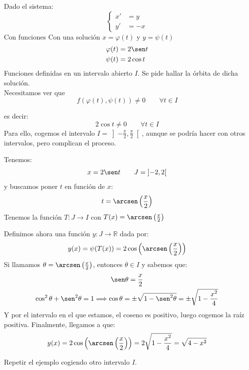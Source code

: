 \begin{ejemplo}
    Dado el sistema:
    \begin{equation*}
        \left\{\begin{array}{rl}
                x' &= y \\
                y' &= -x
        \end{array}\right.
    \end{equation*}
    Con funciones
    Con una solución $x = \varphi(t)$ y $y=\psi(t)$
    \begin{align*}
        \varphi(t) &= 2\sen t \\
        \psi(t) &= 2\cos t \\
    \end{align*}
    Funciones definidas en un intervalo abierto $I$. Se pide hallar la órbita de dicha solución.\\
    Necesitamos ver que
    \begin{equation*}
        f(\varphi(t),\psi(t)) \neq 0 \qquad \forall t\in I
    \end{equation*}

    es decir:
    \begin{equation*}
        2\cos t \neq 0 \qquad \forall t\in I
    \end{equation*}
    Para ello, cogemos el intervalo $I = \left]-\frac{\pi}{2}, \frac{\pi}{2}\right[$, aunque se podría hacer con otros intervalos, pero complican el proceso.

    Tenemos:
    \begin{equation*}
        x=2\sen t \qquad J=\left]-2,2\right[
    \end{equation*}
    y buscamos poner $t$ en función de $x$:
    \begin{equation*}
        t = \arcsen \left(\dfrac{x}{2}\right)
    \end{equation*}
    Tenemos la función $T:J\rightarrow I$ con $T(x) = \arcsen \left(\frac{x}{2}\right)$

    Definimos ahora una función $y:J\rightarrow \mathbb{R}$ dada por:
    \begin{equation*}
        y(x) = \psi(T(x)) = 2\cos\left(\arcsen\left(\dfrac{x}{2}\right)\right)
    \end{equation*}
    Si llamamos $\theta = \arcsen\left(\frac{x}{2}\right)$, entonces $\theta \in I$ y sabemos que:
    \begin{gather*}
        \sen \theta = \dfrac{x}{2}\\
        \cos^2 \theta + \sen^2 \theta = 1 \Longrightarrow \cos \theta = \pm \sqrt{1-\sen^2 \theta} = \pm \sqrt{1-\dfrac{x^2}{4}}
    \end{gather*}
    Y por el intervalo en el que estamos, el coseno es positivo, luego cogemos la raíz positiva. Finalmente, llegamos a que:
    \begin{equation*}
        y(x) = 2\cos\left(\arcsen\left(\dfrac{x}{2}\right)\right) = 2\sqrt{1-\dfrac{x^2}{4}} = \sqrt{4-x^2}
    \end{equation*}
\end{ejemplo}

\begin{ejercicio}
    Repetir el ejemplo cogiendo otro intervalo $I$.
\end{ejercicio}
